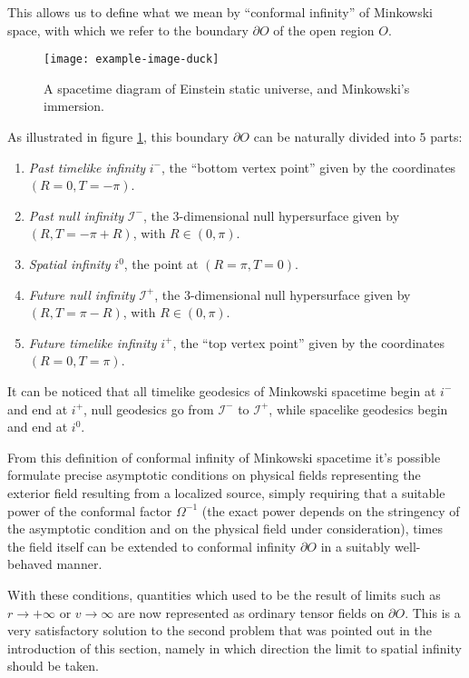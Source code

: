 This allows us to define what we mean by ``conformal infinity'' of Minkowski space, with which we refer to the boundary \(\partial O\) of the open region \(O\).
\begin{figure}
	\centering
	\texttt{[image: example-image-duck]}
	\caption{A spacetime diagram of Einstein static universe, and Minkowski's immersion.}
	\label{fig:Einstein-static-universe}
\end{figure}

As illustrated in figure \ref{fig:Einstein-static-universe}, this boundary \(\partial O\) can be naturally divided into \(5\) parts:
\begin{enumerate}[label=(\arabic*)]
	\item \emph{Past timelike infinity} \(i^{-}\), the ``bottom vertex point'' given by the coordinates \((R = 0, T = -\pi)\).
	\item \emph{Past null infinity} \(\mathscr{I}^-\), the \(3\)-dimensional null hypersurface given by \((R, T = -\pi + R)\), with \(R \in (0, \pi)\).
	\item \emph{Spatial infinity} \(i^0\), the point at \((R=\pi, T = 0)\).
	\item \emph{Future null infinity} \(\mathscr{I}^+\), the \(3\)-dimensional null hypersurface given by \((R, T = \pi - R)\), with \(R \in (0, \pi)\).
	\item \emph{Future timelike infinity} \(i^{+}\), the ``top vertex point'' given by the coordinates \((R = 0, T = \pi)\).
\end{enumerate}

It can be noticed that all timelike geodesics of Minkowski spacetime begin at \(i^-\) and end at \(i^+\), null geodesics go from \(\mathscr{I}^-\) to \(\mathscr{I}^+\), while spacelike geodesics begin and end at \(i^0\).

From this definition of conformal infinity of Minkowski spacetime it's possible formulate precise asymptotic conditions on physical fields representing the exterior field resulting from a localized source, simply requiring that a suitable power of the conformal factor \(\Omega^{-1}\) (the exact power depends on the stringency of the asymptotic condition and on the physical field under consideration), times the field itself can be extended to conformal infinity \(\partial O\) in a suitably well-behaved manner.

With these conditions, quantities which used to be the result of limits such as \(r\rightarrow +\infty\) or \(v\rightarrow \infty\) are now represented as ordinary tensor fields on \(\partial O\). This is a very satisfactory solution to the second problem that was pointed out in the introduction of this section, namely in which direction the limit to spatial infinity should be taken.

